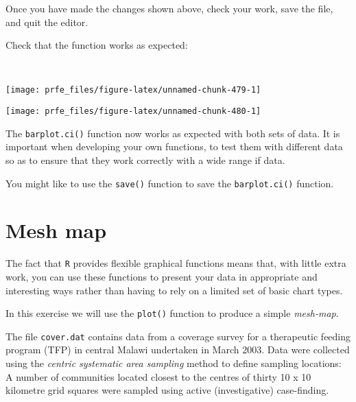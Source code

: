 \documentclass[
  12pt,
  a4paper]{book}
\newenvironment{Shaded}{\begin{snugshade}}{\end{snugshade}}
\newcommand{\FunctionTok}[1]{\textcolor[rgb]{0.00,0.00,0.00}{#1}}
\newcommand{\NormalTok}[1]{#1}
\newcommand{\SpecialCharTok}[1]{\textcolor[rgb]{0.00,0.00,0.00}{#1}}
\begin{document}
\newpage

Once you have made the changes shown above, check your work, save the file, and quit the editor.

Check that the function works as expected:

~

\begin{Shaded}
\end{Shaded}

\begin{center}\texttt{[image: prfe\_files/figure-latex/unnamed-chunk-479-1]} \end{center}

\begin{center}\texttt{[image: prfe\_files/figure-latex/unnamed-chunk-480-1]} \end{center}

\newpage

The \texttt{barplot.ci()} function now works as expected with both sets of data. It is important when developing your own functions, to test them with different data so as to ensure that they work correctly with a wide range if data.

You might like to use the \texttt{save()} function to save the \texttt{barplot.ci()} function.

\hypertarget{mesh-map}{%
\section{Mesh map}\label{mesh-map}}

The fact that \texttt{R} provides flexible graphical functions means that, with little extra work, you can use these functions to present your data in appropriate and interesting ways rather than having to rely on a limited set of basic chart types.

In this exercise we will use the \texttt{plot()} function to produce a simple \emph{mesh-map}.

The file \texttt{cover.dat} contains data from a coverage survey for a therapeutic feeding program (TFP) in central Malawi undertaken in March 2003. Data were collected using the \emph{centric systematic area sampling} method to define sampling locations: A number of communities located closest to the centres of thirty 10 x 10 kilometre grid squares were sampled using active (investigative) case-finding.
\end{document}
